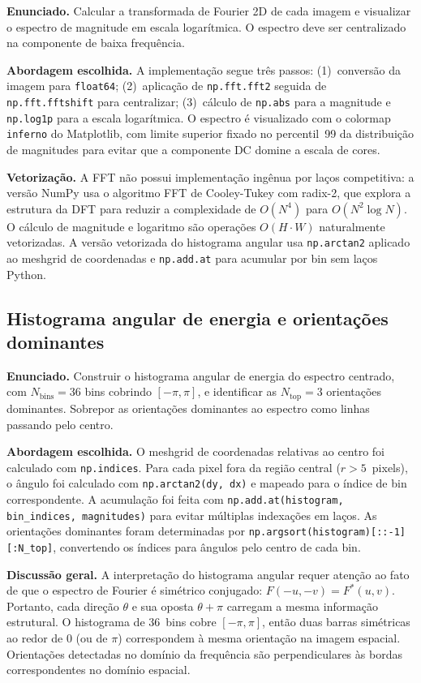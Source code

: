 \documentclass[12pt,a4paper]{article}
\newcommand{\campo}[2]{\textbf{#1.} #2\par}
\begin{document}
\campo{Enunciado}{Calcular a transformada de Fourier 2D de cada imagem e visualizar
o espectro de magnitude em escala logarítmica. O espectro deve ser centralizado na
componente de baixa frequência.}

\campo{Abordagem escolhida}{A implementação segue três passos: (1)~conversão da imagem
para \texttt{float64}; (2)~aplicação de \texttt{np.fft.fft2} seguida de
\texttt{np.fft.fftshift} para centralizar; (3)~cálculo de \texttt{np.abs} para a
magnitude e \texttt{np.log1p} para a escala logarítmica. O espectro é visualizado com
o colormap \texttt{inferno} do Matplotlib, com limite superior fixado no percentil~99 da
distribuição de magnitudes para evitar que a componente DC domine a escala de cores.}

\campo{Vetorização}{A FFT não possui implementação ingênua por laços competitiva:
a versão NumPy usa o algoritmo FFT de Cooley-Tukey com radix-2, que explora a estrutura
da DFT para reduzir a complexidade de $O(N^4)$ para $O(N^2 \log N)$.
O cálculo de magnitude e logaritmo são operações $O(H \cdot W)$ naturalmente vetorizadas.
A versão vetorizada do histograma angular usa \texttt{np.arctan2} aplicado ao meshgrid
de coordenadas e \texttt{np.add.at} para acumular por bin sem laços Python.}

\subsection{Histograma angular de energia e orientações dominantes}

\campo{Enunciado}{Construir o histograma angular de energia do espectro centrado,
com $N_{\text{bins}}=36$ bins cobrindo $[-\pi, \pi]$, e identificar as
$N_{\text{top}}=3$ orientações dominantes. Sobrepor as orientações dominantes ao
espectro como linhas passando pelo centro.}

\campo{Abordagem escolhida}{O meshgrid de coordenadas relativas ao centro foi
calculado com \texttt{np.indices}. Para cada pixel fora da
região central ($r > 5$~pixels), o ângulo foi calculado com \texttt{np.arctan2(dy, dx)}
e mapeado para o índice de bin correspondente. A acumulação foi feita com
\texttt{np.add.at(histogram, bin\_indices, magnitudes)} para evitar múltiplas
indexações em laços. As orientações dominantes foram determinadas por
\texttt{np.argsort(histogram)[::-1][:N\_top]}, convertendo os índices para ângulos
pelo centro de cada bin.}

\campo{Discussão geral}{A interpretação do histograma angular requer atenção ao fato
de que o espectro de Fourier é simétrico conjugado: $F(-u,-v) = F^*(u,v)$. Portanto,
cada direção $\theta$ e sua oposta $\theta + \pi$ carregam a mesma informação estrutural.
O histograma de 36~bins cobre $[-\pi, \pi]$, então duas barras simétricas ao redor
de 0 (ou de $\pi$) correspondem à mesma orientação na imagem espacial.
Orientações detectadas no domínio da frequência são perpendiculares às bordas
correspondentes no domínio espacial.}
\end{document}

